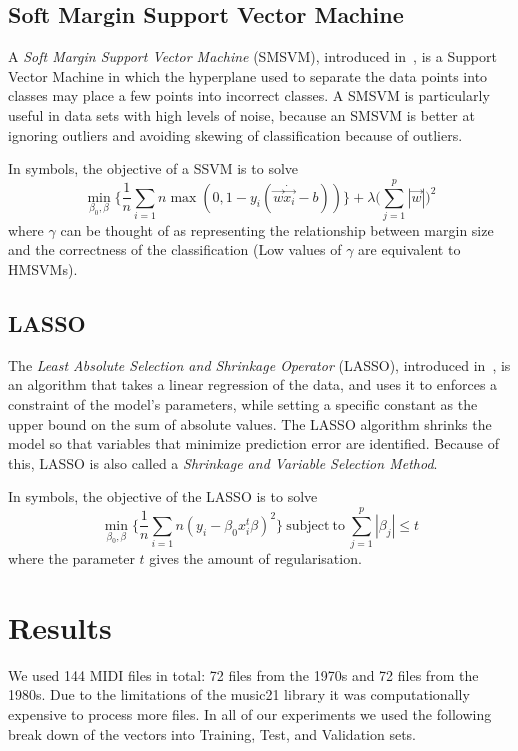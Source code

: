 \documentclass[twocolumn,dvipsnames]{article}
\newcommand\len[1]{\left|#1\right|}
\begin{document}
\subsection{Soft Margin Support Vector Machine}
A \textit{Soft Margin Support Vector Machine} (SMSVM),
introduced in~\cite{Cortes1995},
is a Support Vector Machine in which the hyperplane used to separate the data points into classes may place a few points into incorrect classes.
A SMSVM is particularly useful in data sets with high levels of noise,
because an SMSVM is better at ignoring outliers and avoiding skewing of classification because of outliers.

In symbols, the objective of a SSVM is to solve
\begin{equation*}
    \min_{\beta_0, \beta} \Big\{ \frac{1}{n} \sum_{i=1}{n} \max (0, 1 - y_i (\vec{w} \dot \vec{x_i} - b)) \Big\} + \lambda \Bigg(\sum_{j=1}^p \len{\vec{w}}\Bigg)^2
\end{equation*}
where $\gamma$ can be thought of as representing the relationship between margin size and the correctness of the classification
(Low values of $\gamma$ are equivalent to HMSVMs).

\subsection{LASSO}
The \textit{Least Absolute Selection and Shrinkage Operator} (LASSO),
introduced in~\cite{tibshirani1996regression},
is an algorithm that takes a linear regression of the data,
and uses it to enforces a constraint of the model's parameters,
while setting a specific constant as the upper bound on the sum of absolute values.
The LASSO algorithm shrinks the model so that variables that minimize prediction error are identified.
Because of this, LASSO is also called a \textit{Shrinkage and Variable Selection Method}.

In symbols, the objective of the LASSO is to solve
\begin{equation*}
    \min_{\beta_0, \beta} \Big\{ \frac{1}{n} \sum_{i=1}{n} {(y_i - \beta_0 x_i^t \beta)}^2 \Big\} \mathrm{\ subject\ to\ } \sum_{j=1}^p \len{\beta_j} \leq t
\end{equation*}
where the parameter $t$ gives the amount of regularisation.

\section{Results}

We used 144 MIDI files in total: 72 files from the 1970s and 72 files from the 1980s.
Due to the limitations of the music21 library it was computationally expensive to process more files.
In all of our experiments we used the following break down of the vectors into Training, Test, and Validation sets.
\end{document}
